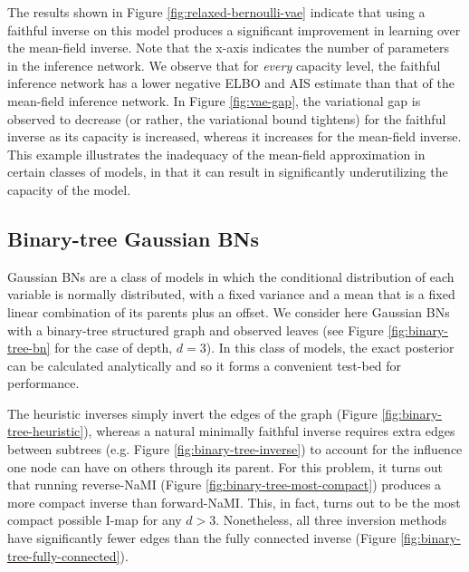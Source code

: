 The results shown in Figure \ref{fig:relaxed-bernoulli-vae} indicate that using a faithful inverse on this model produces a
significant improvement in learning over the mean-field inverse.
Note that the x-axis indicates the number of parameters in the inference network. We observe that for \emph{every} capacity level, the faithful inference network has a lower negative ELBO and AIS estimate than that of the mean-field inference network. In Figure \ref{fig:vae-gap}, the variational gap is observed to decrease (or rather, the variational bound tightens) for the faithful inverse as its capacity is increased, whereas it increases for the mean-field inverse.
This example illustrates the inadequacy of the mean-field approximation in certain classes of models, in that it can result in significantly underutilizing the capacity of the model.

\subsection{Binary-tree Gaussian BNs}\label{sec:binary-tree-experiment}



Gaussian BNs are a class of models in which the conditional distribution of each variable is normally distributed, with a fixed variance and a mean that is a fixed linear combination of its parents plus an offset. We consider here Gaussian BNs with a binary-tree structured graph and observed leaves (see Figure \ref{fig:binary-tree-bn} for the case of depth, $d=3$). In this class of models, the exact posterior can be calculated analytically \citep[\S7.2]{KollerFriedman2009} and so it forms a convenient test-bed for performance.

The heuristic inverses simply invert the edges of the graph (Figure \ref{fig:binary-tree-heuristic}), whereas a natural minimally faithful inverse requires extra edges between subtrees (e.g. Figure \ref{fig:binary-tree-inverse}) to account for the influence one node can have on others through its parent.
For this problem, it turns out that running reverse-NaMI (Figure \ref{fig:binary-tree-most-compact}) produces
a more compact inverse than forward-NaMI. This, in fact, turns out to be the most compact possible I-map for any $d>3$.
Nonetheless, all three inversion methods have significantly fewer edges than the fully connected inverse (Figure \ref{fig:binary-tree-fully-connected}).

